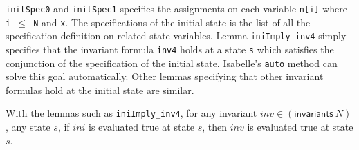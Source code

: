 \documentclass[final]{IEEEtran}
\begin{document}
{\tt initSpec0} and {\tt initSpec1} specifies the assignments on each variable {\tt n[i]} where {\tt i $\le$ N} and {\tt x}. The  specifications of the initial state is the list of all the specification definition on related state variables. Lemma {\tt iniImply\_inv4} simply specifies that the invariant formula {\tt inv4} holds at a state {\tt s} which satisfies the conjunction of the   specification of the initial state. Isabelle's {\tt auto} method can solve this goal automatically. Other lemmas specifying that other invariant formulas hold at the initial state are similar.

With the lemmas such as {\tt iniImply\_inv4}, for any invariant $inv \in (\mathsf{invariants} ~N) $,  any
state $s$, if $ini$ is evaluated true at state $s$, then $inv$ is
evaluated true at state $s$.
\end{document}
